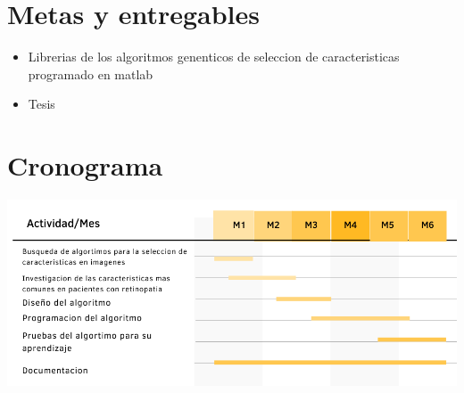 \documentclass[12pt,letterpaper]{article}
\begin{document}
\section{Metas y entregables}
\begin{itemize}
	\item Librerias de los algoritmos genenticos de seleccion de caracteristicas programado en matlab
	\item Tesis
\end{itemize}
\section{Cronograma}
	\includegraphics[scale=.5]{IMAGENES/ActividadMes.png}
\newpage





\newpage
\end{document}
